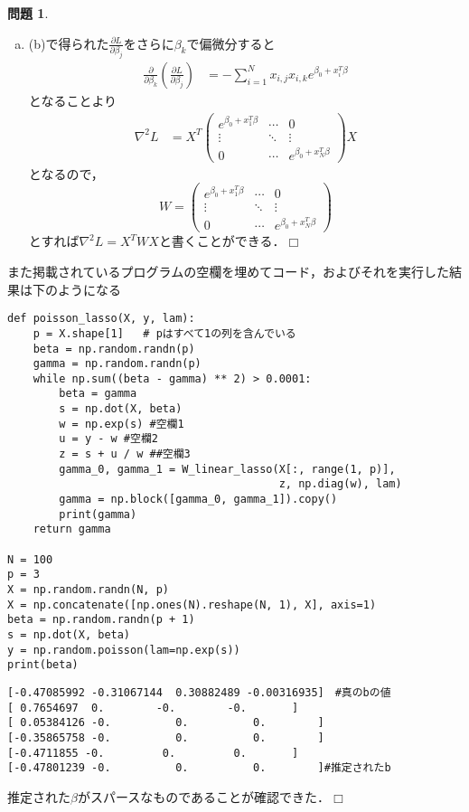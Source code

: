 \documentclass{jsarticle}
\theoremstyle{definition}
\newtheorem{Ex}{問題}
\theoremstyle{mystyle} %
\renewcommand{\footnotesize}{\normalsize}
\def\qed{\hfill$\Box$}
\begin{document}
\begin{Ex}
\begin{enumerate}[(a)]
\item (b)で得られた$\frac{\partial L}{\partial \beta_j}$をさらに$\beta_k$で偏微分すると
\begin{align*}
\frac{\partial }{\partial \beta_k}\left(\frac{\partial L}{\partial \beta_j}\right)&=-\sum_{i=1}^N x_{i,j}x_{i,k}e^{\beta_0+x_i^T \beta}
\end{align*}
となることより
\begin{align*}
\nabla^2 L &=X^T \begin{pmatrix}
e^{\beta_0+x_1^T \beta} & \cdots & 0\\
\vdots & \ddots & \vdots \\
0 & \cdots & e^{\beta_0+x_N^T \beta}
\end{pmatrix}X
\end{align*}
となるので，
$$W = \begin{pmatrix}
e^{\beta_0+x_1^T \beta} & \cdots & 0\\
\vdots & \ddots & \vdots \\
0 & \cdots & e^{\beta_0+x_N^T \beta}
\end{pmatrix}$$
とすれば$\nabla^2 L =X^TWX$と書くことができる．\qed\\
\end{enumerate}
また掲載されているプログラムの空欄を埋めてコード，およびそれを実行した結果は下のようになる
\begin{lstlisting}[basicstyle = \ttfamily\footnotesize, frame = single]
def poisson_lasso(X, y, lam):
    p = X.shape[1]   # pはすべて1の列を含んでいる
    beta = np.random.randn(p)
    gamma = np.random.randn(p)
    while np.sum((beta - gamma) ** 2) > 0.0001:
        beta = gamma
        s = np.dot(X, beta)
        w = np.exp(s) #空欄1
        u = y - w #空欄2
        z = s + u / w ##空欄3
        gamma_0, gamma_1 = W_linear_lasso(X[:, range(1, p)],
                                          z, np.diag(w), lam)
        gamma = np.block([gamma_0, gamma_1]).copy()
        print(gamma)
    return gamma

N = 100    
p = 3
X = np.random.randn(N, p)
X = np.concatenate([np.ones(N).reshape(N, 1), X], axis=1)
beta = np.random.randn(p + 1)
s = np.dot(X, beta)
y = np.random.poisson(lam=np.exp(s))
print(beta)
\end{lstlisting}
\begin{lstlisting}[basicstyle = \ttfamily\footnotesize, frame = single]
[-0.47085992 -0.31067144  0.30882489 -0.00316935]　#真のbの値
[ 0.7654697  0.        -0.        -0.       ]
[ 0.05384126 -0.          0.          0.        ]
[-0.35865758 -0.          0.          0.        ]
[-0.4711855 -0.         0.         0.       ]
[-0.47801239 -0.          0.          0.        ]#推定されたb
\end{lstlisting}
推定された$\beta$がスパースなものであることが確認できた．\qed\\

\end{Ex}
\end{document}
